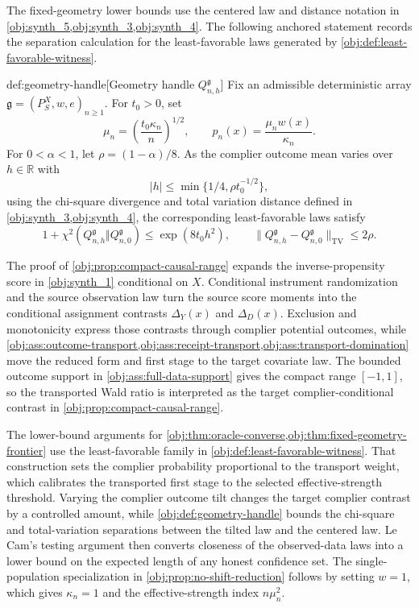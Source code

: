 The fixed-geometry lower bounds use the centered law and distance notation in \cref{obj:synth_5,obj:synth_3,obj:synth_4}.  The following anchored statement records the separation calculation for the least-favorable laws generated by \cref{obj:def:least-favorable-witness}.

\begin{definitionv}{def:geometry-handle}[Geometry handle \(Q_{n,h}^{\mathfrak g}\)]
Fix an admissible deterministic array \(\mathfrak g=(P_S^X,w,e)_{n\ge1}\). For \(t_0>0\), set
\[
\mu_n=\left(\frac{t_0\kappa_n}{n}\right)^{1/2},
\qquad
p_n(x)=\frac{\mu_n w(x)}{\kappa_n}.
\]
For \(0<\alpha<1\), let \(\rho=(1-\alpha)/8\). As the complier outcome mean varies over \(h\in\mathbb R\) with
\[
|h|\le \min\{1/4,\rho t_0^{-1/2}\},
\]
using the chi-square divergence and total variation distance defined in \cref{obj:synth_3,obj:synth_4}, the corresponding least-favorable laws satisfy
\[
1+\chi^2(Q_{n,h}^{\mathfrak g}\Vert Q_{n,0}^{\mathfrak g})
\le \exp(8t_0h^2),
\qquad
\|Q_{n,h}^{\mathfrak g}-Q_{n,0}^{\mathfrak g}\|_{\mathrm{TV}}
\le 2\rho .
\]
\end{definitionv}

The proof of \cref{obj:prop:compact-causal-range} expands the inverse-propensity score in \cref{obj:synth_1} conditional on \(X\).  Conditional instrument randomization and the source observation law turn the source score moments into the conditional assignment contrasts \(\Delta_Y(x)\) and \(\Delta_D(x)\).  Exclusion and monotonicity express those contrasts through complier potential outcomes, while \cref{obj:ass:outcome-transport,obj:ass:receipt-transport,obj:ass:transport-domination} move the reduced form and first stage to the target covariate law.  The bounded outcome support in \cref{obj:ass:full-data-support} gives the compact range \([-1,1]\), so the transported Wald ratio is interpreted as the target complier-conditional contrast in \cref{obj:prop:compact-causal-range}.

The lower-bound arguments for \cref{obj:thm:oracle-converse,obj:thm:fixed-geometry-frontier} use the least-favorable family in \cref{obj:def:least-favorable-witness}.  That construction sets the complier probability proportional to the transport weight, which calibrates the transported first stage to the selected effective-strength threshold.  Varying the complier outcome tilt changes the target complier contrast by a controlled amount, while \cref{obj:def:geometry-handle} bounds the chi-square and total-variation separations between the tilted law and the centered law.  Le Cam's testing argument then converts closeness of the observed-data laws into a lower bound on the expected length of any honest confidence set.  The single-population specialization in \cref{obj:prop:no-shift-reduction} follows by setting \(w=1\), which gives \(\kappa_n=1\) and the effective-strength index \(n\mu_n^2\).


